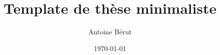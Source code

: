 \documentclass[a4paper,12pt,twoside]{book}
\title{Template de thèse minimaliste}
\author{Antoine Bérut}
\date\today
\begin{document}
\frontmatter



\newpage

\begin{small}
\tableofcontents
\end{small}

\mainmatter














\newpage
\thispagestyle{empty}
\hspace{1cm}
\end{document}
